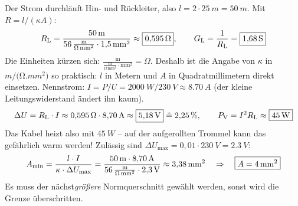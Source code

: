 \documentclass[11pt,a4paper]{article}
\begin{document}
\begin{loesung}
Der Strom durchläuft Hin- und Rückleiter, also $l = 2\cdot\SI{25}{m} = \SI{50}{m}$. Mit $R = l/(\kappa A)$:
\[
  R_\text{L} = \frac{\SI{50}{m}}{\SI{56}{\frac{m}{\ohm\,mm^2}}\cdot\SI{1.5}{mm^2}} \approx \boxed{\SI{0.595}{\ohm}},
  \qquad G_\text{L} = \frac{1}{R_\text{L}} = \boxed{\SI{1.68}{S}}
\]
Die Einheiten kürzen sich: $\frac{\mathrm{m}}{\frac{\mathrm{m}}{\Omega\,\mathrm{mm^2}}\cdot\mathrm{mm^2}} = \Omega$. Deshalb ist die Angabe von $\kappa$ in $\si{m/(\ohm.mm^2)}$ so praktisch: $l$ in Metern und $A$ in Quadratmillimetern direkt einsetzen.
Nennstrom: $I = P/U = \SI{2000}{W}/\SI{230}{V} \approx \SI{8.70}{A}$ (der kleine Leitungswiderstand ändert ihn kaum).
\[
  \Delta U = R_\text{L}\cdot I \approx \SI{0.595}{\ohm}\cdot\SI{8.70}{A} \approx \boxed{\SI{5.18}{V}} \;\hat{=}\; \SI{2.25}{\percent},
  \qquad P_\text{V} = I^2 R_\text{L} \approx \boxed{\SI{45}{W}}
\]
Das Kabel heizt also mit $\SI{45}{W}$ -- auf der aufgerollten Trommel kann das gefährlich warm werden!
Zulässig sind $\Delta U_\text{max} = 0{,}01\cdot\SI{230}{V} = \SI{2.3}{V}$:
\[
  A_\text{min} = \frac{l\cdot I}{\kappa\cdot\Delta U_\text{max}} = \frac{\SI{50}{m}\cdot\SI{8.70}{A}}{\SI{56}{\frac{m}{\ohm\,mm^2}}\cdot\SI{2.3}{V}} \approx \SI{3.38}{mm^2}
  \quad\Rightarrow\quad \boxed{A = \SI{4}{mm^2}}
\]
Es muss der nächst\emph{größere} Normquerschnitt gewählt werden, sonst wird die Grenze überschritten.
\end{loesung}
\end{document}
